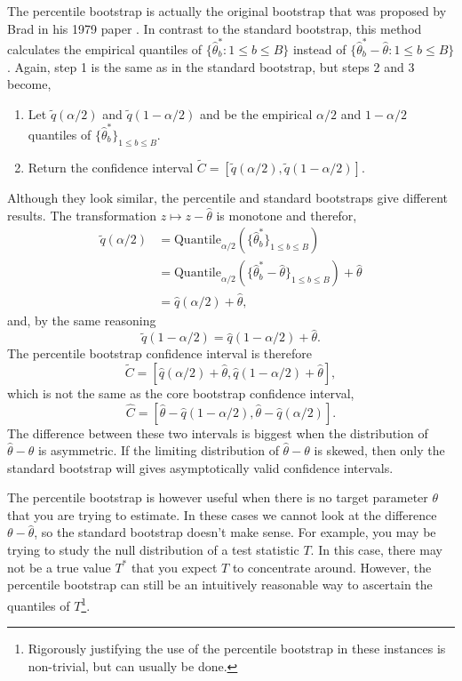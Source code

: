 The percentile bootstrap is actually the original bootstrap that was proposed by Brad in his 1979 paper \cite{efron79}. In contrast to the standard bootstrap, this method calculates the empirical quantiles of $\{\hat{\theta}^*_b:1 \le b \le B\}$ instead of $\{\hat{\theta}^*_b-\hat{\theta} : 1 \le b \le B\}$. Again, step 1 is the same as in the standard bootstrap, but steps 2 and 3 become,
\begin{enumerate}[label={\arabic*$'.$},start=2]
\item
  Let $\tilde{q}(\alpha/2)$ and $\tilde{q}(1-\alpha/2)$ and be the empirical $\alpha/2$ and $1-\alpha/2$ quantiles of $\{\hat{\theta}^*_b \}_{1 \leq b \leq B}$. 
  \item
  Return the confidence interval $\tilde{C} = [ \tilde{q}(\alpha/2),  \tilde{q}(1-\alpha/2)]$. 
\end{enumerate}
Although they look similar, the percentile and standard bootstraps give different results. The transformation $z\mapsto z-\hat{\theta}$ is monotone and therefor,
\begin{align*}
  \tilde{q}(\alpha/2)&=\mathrm{Quantile}_{\alpha/2}(\{\hat{\theta}_b^* \}_{1 \le b \le B}) \\
  &=\mathrm{Quantile}_{\alpha/2}(\{\hat{\theta}_b^*-\hat{\theta} \}_{1 \le b \le B}) + \hat{\theta}\\
  &=\hat{q}(\alpha/2) + \hat{\theta},
\end{align*}
and, by the same reasoning 
\[\tilde{q}(1-\alpha/2) = \hat{q}(1-\alpha/2)+\hat{\theta}.\]
The percentile bootstrap confidence interval is therefore 
\[\tilde{C} = [\hat{q}(\alpha/2)+\hat{\theta}, \hat{q}(1-\alpha/2)+\hat{\theta}], \]
which is not the same as the core bootstrap confidence interval,
\[\hat{C} = [\hat{\theta} - \hat{q}(1-\alpha/2), \hat{\theta} - \hat{q}(\alpha/2)].\]
The difference between these two intervals is biggest when the distribution of $\hat{\theta}-\theta$ is asymmetric. If the limiting distribution of $\hat{\theta}-\theta$ is skewed, then only the standard bootstrap will gives asymptotically valid confidence intervals.


The percentile bootstrap is however useful when there is no target parameter $\theta$ that you are trying to estimate. In these cases we cannot look at the difference $\theta - \hat{\theta}$, so the standard bootstrap doesn't make sense. For example, you may be trying to study the null distribution of a test statistic $T$. In this case, there may not be a true value $T^*$ that you expect $T$ to concentrate around. However, the percentile bootstrap can still be an intuitively reasonable way to ascertain the quantiles of $T$\footnote{Rigorously justifying the use of the percentile bootstrap in these instances is non-trivial, but can usually be done.}.



